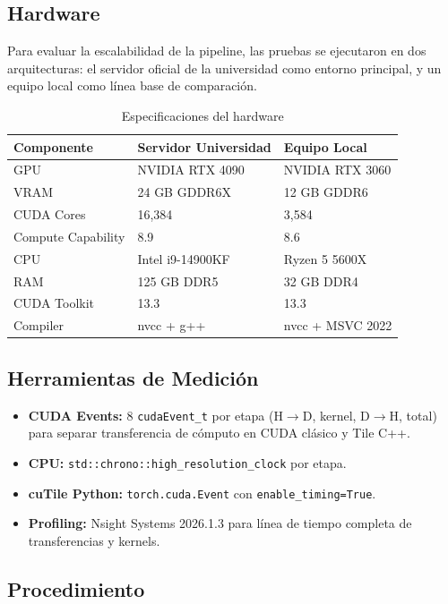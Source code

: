 \documentclass[12pt,a4paper]{article}
\begin{document}
\subsection{Hardware}

Para evaluar la escalabilidad de la pipeline, las pruebas se ejecutaron en dos arquitecturas: el servidor oficial de la universidad como entorno principal, y un equipo local como l\'inea base de comparaci\'on.

\begin{table}[H]
\centering
\caption{Especificaciones del hardware}
\begin{tabular}{lll}
\toprule
\textbf{Componente} & \textbf{Servidor Universidad} & \textbf{Equipo Local} \\
\midrule
GPU & NVIDIA RTX 4090 & NVIDIA RTX 3060 \\
VRAM & 24 GB GDDR6X & 12 GB GDDR6 \\
CUDA Cores & 16,384 & 3,584 \\
Compute Capability & 8.9 & 8.6 \\
CPU & Intel i9-14900KF & Ryzen 5 5600X \\
RAM & 125 GB DDR5 & 32 GB DDR4 \\
CUDA Toolkit & 13.3 & 13.3 \\
Compiler & nvcc + g++ & nvcc + MSVC 2022 \\
\bottomrule
\end{tabular}
\end{table}

\subsection{Herramientas de Medici\'on}

\begin{itemize}
  \item \textbf{CUDA Events:} 8 \texttt{cudaEvent\_t} por etapa (H$\rightarrow$D, kernel, D$\rightarrow$H, total) para separar transferencia de c\'omputo en CUDA cl\'asico y Tile C++.
  \item \textbf{CPU:} \texttt{std::chrono::high\_resolution\_clock} por etapa.
  \item \textbf{cuTile Python:} \texttt{torch.cuda.Event} con \texttt{enable\_timing=True}.
  \item \textbf{Profiling:} Nsight Systems 2026.1.3 para l\'inea de tiempo completa de transferencias y kernels.
\end{itemize}

\subsection{Procedimiento}
\end{document}
